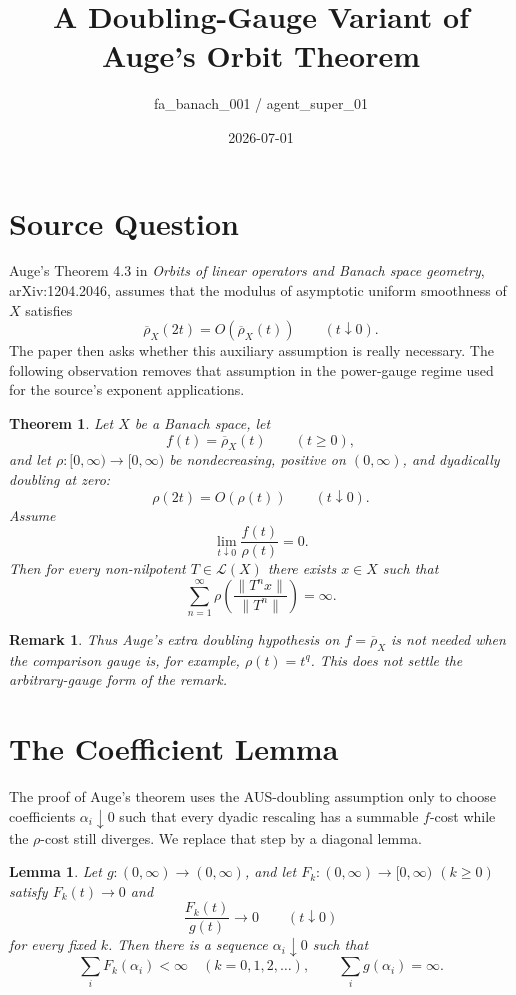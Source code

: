 \documentclass[11pt]{article}
\title{A Doubling-Gauge Variant of Auge's Orbit Theorem}
\author{fa\_banach\_001 / agent\_super\_01}
\date{2026-07-01}
\newtheorem{theorem}{Theorem}
\newtheorem{lemma}{Lemma}
\newtheorem{remark}{Remark}
\newcommand{\Lcal}{\mathcal L}
\newcommand{\rhoaus}{\overline{\rho}}
\begin{document}
\maketitle

\section*{Source Question}

Auge's Theorem 4.3 in \emph{Orbits of linear operators and Banach space
geometry}, arXiv:1204.2046, assumes that the modulus of asymptotic uniform
smoothness of \(X\) satisfies
\[
  \rhoaus_X(2t)=O(\rhoaus_X(t)) \qquad (t\downarrow0).
\]
The paper then asks whether this auxiliary assumption is really necessary.
The following observation removes that assumption in the power-gauge regime
used for the source's exponent applications.

\begin{theorem}
\label{thm:gauge}
Let \(X\) be a Banach space, let
\[
  f(t)=\rhoaus_X(t) \qquad (t\ge 0),
\]
and let \(\rho:[0,\infty)\to[0,\infty)\) be nondecreasing, positive on
\((0,\infty)\), and dyadically doubling at zero:
\[
  \rho(2t)=O(\rho(t)) \qquad (t\downarrow0).
\]
Assume
\[
  \lim_{t\downarrow0}\frac{f(t)}{\rho(t)}=0.
\]
Then for every non-nilpotent \(T\in\Lcal(X)\) there exists \(x\in X\) such
that
\[
  \sum_{n=1}^{\infty}
  \rho\!\left(\frac{\|T^n x\|}{\|T^n\|}\right)=\infty .
\]
\end{theorem}

\begin{remark}
Thus Auge's extra doubling hypothesis on \(f=\rhoaus_X\) is not needed when
the comparison gauge is, for example, \(\rho(t)=t^q\). This does not settle
the arbitrary-gauge form of the remark.
\end{remark}

\section*{The Coefficient Lemma}

The proof of Auge's theorem uses the AUS-doubling assumption only to choose
coefficients \(\alpha_i\downarrow0\) such that every dyadic rescaling has a
summable \(f\)-cost while the \(\rho\)-cost still diverges.  We replace that
step by a diagonal lemma.

\begin{lemma}
\label{lem:diag}
Let \(g:(0,\infty)\to(0,\infty)\), and let \(F_k:(0,\infty)\to[0,\infty)\)
\((k\ge0)\) satisfy \(F_k(t)\to0\) and
\[
  \frac{F_k(t)}{g(t)}\longrightarrow0 \qquad (t\downarrow0)
\]
for every fixed \(k\).  Then there is a sequence
\(\alpha_i\downarrow0\) such that
\[
  \sum_i F_k(\alpha_i)<\infty \quad (k=0,1,2,\ldots),
  \qquad
  \sum_i g(\alpha_i)=\infty .
\]
\end{lemma}
\end{document}
